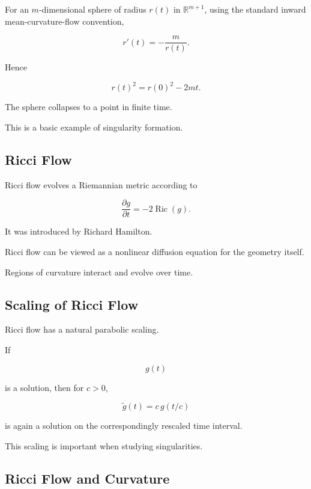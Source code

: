 For an \(m\)-dimensional sphere of radius \(r(t)\) in
\(\mathbb{R}^{m+1}\), using the standard inward mean-curvature-flow
convention,

\[
\boxed{
r'(t)
=
-\frac{m}{r(t)}.
}
\]

Hence

\[
r(t)^2
=
r(0)^2-2mt.
\]

The sphere collapses to a point in finite time.

This is a basic example of singularity formation.

\subsection{Ricci Flow}
\label{subsec:ricci-flow}

Ricci flow evolves a Riemannian metric according to

\[
\boxed{
\frac{\partial g}{\partial t}
=
-2\operatorname{Ric}(g).
}
\]

It was introduced by Richard Hamilton.

Ricci flow can be viewed as a nonlinear diffusion equation for the
geometry itself.

Regions of curvature interact and evolve over time.

\subsection{Scaling of Ricci Flow}
\label{subsec:ricci-flow-scaling}

Ricci flow has a natural parabolic scaling.

If

\[
g(t)
\]

is a solution, then for \(c>0\),

\[
\boxed{
\widetilde g(t)
=
c\,g(t/c)
}
\]

is again a solution on the correspondingly rescaled time interval.

This scaling is important when studying singularities.

\subsection{Ricci Flow and Curvature}
\label{subsec:ricci-flow-curvature}

